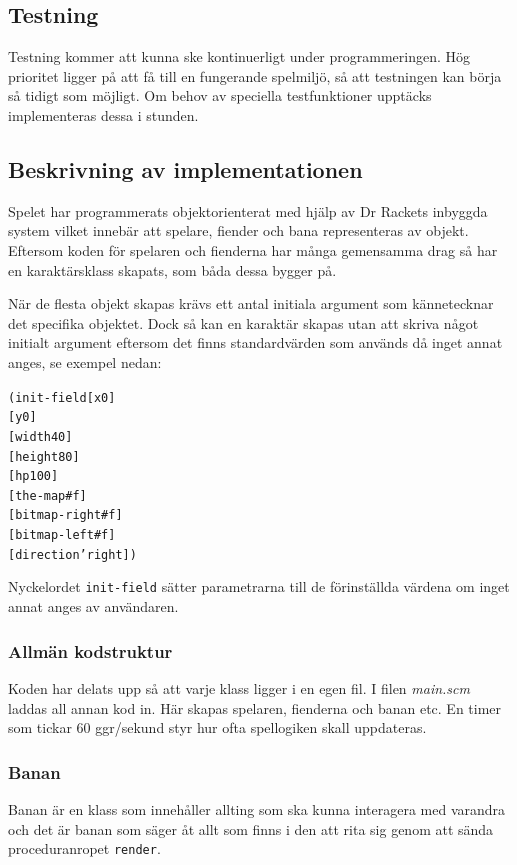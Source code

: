 \documentclass{scrartcl}
\newcommand{\code}[1]%
{\texttt{#1}}
\newcommand{\filename}[1]%
{\textsl{#1}}
\begin{document}


\subsection{Testning}
Testning kommer att kunna ske kontinuerligt under programmeringen. Hög prioritet ligger på att få till en fungerande spelmiljö, så att testningen kan börja så tidigt som möjligt. Om behov av speciella testfunktioner upptäcks implementeras dessa i stunden.

\subsection{Beskrivning av implementationen}
Spelet har programmerats objektorienterat med hjälp av Dr Rackets inbyggda system vilket innebär att spelare, fiender och bana representeras av objekt. Eftersom koden för spelaren och fienderna har många gemensamma drag så har en karaktärsklass skapats, som båda dessa bygger på.

När de flesta objekt skapas krävs ett antal initiala argument som kännetecknar det specifika objektet. Dock så kan en karaktär skapas utan att skriva något initialt argument eftersom det finns standardvärden som används då inget annat anges, se exempel nedan:

\begin{alltt}
(init-field [x 0]
            [y 0]
            [width 40]
            [height 80]
            [hp 100]
            [the-map #f]
            [bitmap-right #f]
            [bitmap-left #f]
            [direction 'right])
\end{alltt}         

Nyckelordet \code{init-field} sätter parametrarna till de förinställda värdena om inget annat anges av användaren. 

\subsubsection{Allmän kodstruktur}

Koden har delats upp så att varje klass ligger i en egen fil. I filen \filename{main.scm} laddas all annan kod in. Här skapas spelaren, fienderna och banan etc. En timer som tickar 60 ggr/sekund styr hur ofta spellogiken skall uppdateras. 

\subsubsection{Banan}
Banan är en klass som innehåller allting som ska kunna interagera med varandra och det är banan som säger åt allt som finns i den att rita sig genom att sända proceduranropet \code{render}.
\end{document}
